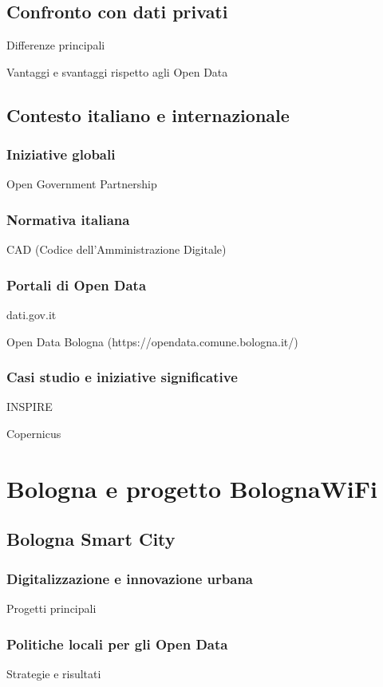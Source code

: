 \subsection{Confronto con dati privati}
Differenze principali

Vantaggi e svantaggi rispetto agli Open Data

\subsection{Contesto italiano e internazionale}
\subsubsection{Iniziative globali}
Open Government Partnership

\subsubsection{Normativa italiana}
CAD (Codice dell'Amministrazione Digitale)

\subsubsection{Portali di Open Data}
dati.gov.it

Open Data Bologna (https://opendata.comune.bologna.it/)

\subsubsection{Casi studio e iniziative significative}
INSPIRE

Copernicus


\section{Bologna e progetto BolognaWiFi}  %
\subsection{Bologna Smart City}
\subsubsection{Digitalizzazione e innovazione urbana}
Progetti principali

\subsubsection{Politiche locali per gli Open Data}
Strategie e risultati

